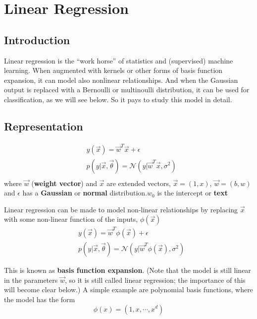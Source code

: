 \chapter{Linear Regression}


\section{Introduction}
Linear regression is the “work horse” of statistics and (supervised) machine learning. When augmented with kernels or other forms of basis function expansion, it can model also nonlinear relationships. And when the Gaussian output is replaced with a Bernoulli or multinoulli distribution, it can be used for classification, as we will see below. So it pays to study this model in detail.


\section{Representation}

\begin{eqnarray}
& y(\vec{x}) = \vec{w}^T\vec{x}+\epsilon \\
& p(y|\vec{x},\vec{\theta})=\mathcal{N}(y|\vec{w}^T\vec{x}, \sigma^2) \\
\end{eqnarray}
where $\vec{w}$ (\textbf{weight vector}) and $\vec{x}$ are extended vectors, $\vec{x}=(1,x)$, $\vec{w}=(b,w)$ and $\epsilon$ has a \textbf{Gaussian} or \textbf{normal} distribution.$w_0$ is the intercept or \textbf{text}

Linear regression can be made to model non-linear relationships by replacing $\vec{x}$ with some non-linear function of the inputs, $\phi(\vec{x})$ 
\begin{eqnarray}
& y(\vec{x}) = \vec{w}^T\phi(\vec{x})+\epsilon \\
& p(y|\vec{x},\vec{\theta})=\mathcal{N}(y|\vec{w}^T\phi(\vec{x}), \sigma^2)
\end{eqnarray}

This is known as \textbf{basis function expansion}. (Note that the model is still linear in the parameters $\vec{w}$, so it is still called linear regression; the importance of this will become clear below.) A simple example are polynomial basis functions, where the model has the form
\begin{equation}
\phi(x)=(1, x, \cdots, x^d)
\end{equation}



